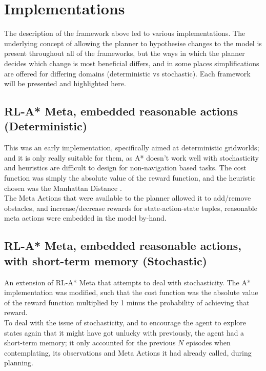 \section{Implementations}
The description of the framework above led to various implementations. The underlying concept of allowing the planner to hypothesise changes to the model is present throughout all of the frameworks, but the ways in which the planner decides which change is most beneficial differs, and in some places simplifications are offered for differing domains (deterministic vs stochastic). Each framework will be presented and highlighted here.
\subsection{RL-A* Meta, embedded reasonable actions (Deterministic)}
This was an early implementation, specifically aimed at deterministic gridworlds; and it is only really suitable for them, as A* doesn't work well with stochasticity and heuristics are difficult to design for non-navigation based tasks. The cost function was simply the absolute value of the reward function, and the heuristic chosen was the Manhattan Distance \citep{krause1973taxicab}.
\\The Meta Actions that were available to the planner allowed it to add/remove obstacles, and increase/decrease rewards for state-action-state tuples, reasonable meta actions were embedded in the model by-hand.
\subsection{RL-A* Meta, embedded reasonable actions, with short-term memory (Stochastic)}
An extension of RL-A* Meta that attempts to deal with stochasticity. The A* implementation was modified, such that the cost function was the absolute value of the reward function multiplied by 1 minus the probability of achieving that reward.
\\To deal with the issue of stochasticity, and to encourage the agent to explore states again that it might have got unlucky with previously, the agent had a short-term memory; it only accounted for the previous $N$ episodes when contemplating, its observations and Meta Actions it had already called, during planning.
